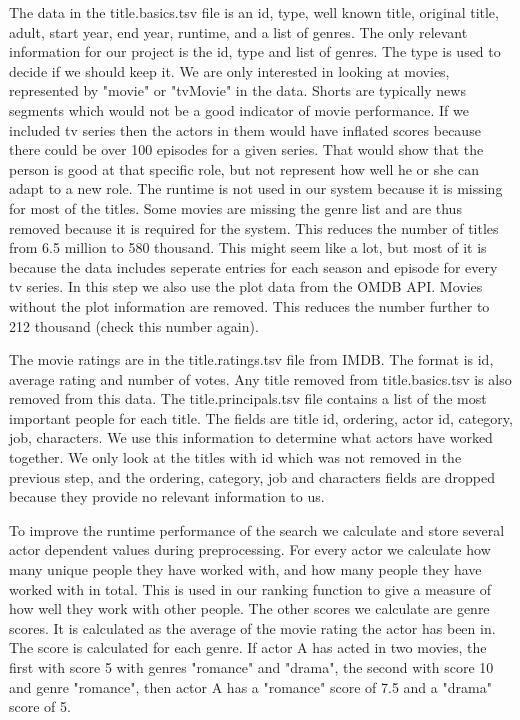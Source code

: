 The data in the title.basics.tsv file is an id,	type, well known title,	original title,	adult, start year, end year, runtime, and a list of genres. The only relevant information for our project is the id, type and list of genres. The type is used to decide if we should keep it. We are only interested in looking at movies, represented by "movie" or "tvMovie" in the data. Shorts are typically news segments which would not be a good indicator of movie performance. If we included tv series then the actors in them would have inflated scores because there could be over 100 episodes for a given series. That would show that the person is good at that specific role, but not represent how well he or she can adapt to a new role. The runtime is not used in our system because it is missing for most of the titles. Some movies are missing the genre list and are thus removed because it is required for the system. This reduces the number of titles from 6.5 million to 580 thousand. This might seem like a lot, but most of it is because the data includes seperate entries for each season and episode for every tv series. In this step we also use the plot data from the OMDB API. Movies without the plot information are removed. This reduces the number further to 212 thousand (check this number again).

The movie ratings are in the title.ratings.tsv file from IMDB. The format is id, average rating and number of votes. Any title removed from title.basics.tsv is also removed from this data. The title.principals.tsv file contains a list of the most important people for each title. The fields are title id, ordering, actor id, category, job, characters. We use this information to determine what actors have worked together. We only look at the titles with id which was not removed in the previous step, and the ordering, category, job and characters fields are dropped because they provide no relevant information to us.

To improve the runtime performance of the search we calculate and store several actor dependent values during preprocessing. For every actor we calculate how many unique people they have worked with, and how many people they have worked with in total. This is used in our ranking function to give a measure of how well they work with other people. The other scores we calculate are genre scores. It is calculated as the average of the movie rating the actor has been in. The score is calculated for each genre. If actor A has acted in two movies, the first with score 5 with genres "romance" and "drama", the second with score 10 and genre "romance", then actor A has a "romance" score of 7.5 and a "drama" score of 5.

